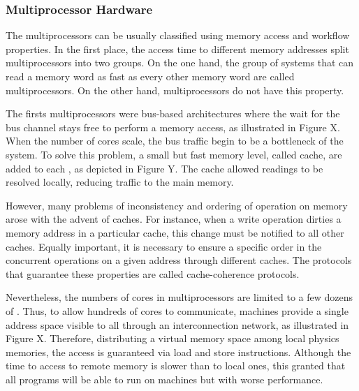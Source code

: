 		\subsubsection{Multiprocessor Hardware}

			The multiprocessors can be usually classified using memory access
			and workflow properties.
			In the first place, the access time to different memory addresses
			split multiprocessors into two groups.
			On the one hand, the group of systems that can read a memory word
			as fast as every other memory word are called \uma multiprocessors.
			On the other hand, \numa multiprocessors do not have this property.
			
			The firsts \uma multiprocessors were bus-based architectures where
			the \cpu wait for the bus channel stays free to perform a memory
			access, as illustrated in Figure X.
			When the number of cores scale, the bus traffic begin to be a
			bottleneck of the system.
			To solve this problem, a small but fast memory level, called cache,
			are added to each \cpu, as depicted in Figure Y.
			The cache allowed readings to be resolved locally, reducing traffic
			to the main memory.

			However, many problems of inconsistency and ordering of operation
			on memory arose with the advent of caches.
			For instance, when a write operation dirties a memory address in
			a particular cache, this change must be notified to all other caches.
			Equally important, it is necessary to ensure a specific order in
			the concurrent operations on a given address through different caches.
			The protocols that guarantee these properties are called cache-coherence protocols.

			Nevertheless, the numbers of cores in \uma multiprocessors are limited
			to a few dozens of \cpus.
			Thus, to allow hundreds of cores to communicate, \numa machines provide
			a single address space visible to all \cpus through an interconnection
			network,  as illustrated in Figure X.
			Therefore, distributing a virtual memory space among local physics memories,
			the access is guaranteed via load and store instructions.
			Although the time to access to remote memory is slower than to local ones,
			this granted that all \uma programs will be able to run on \numa machines
			but with worse performance.


